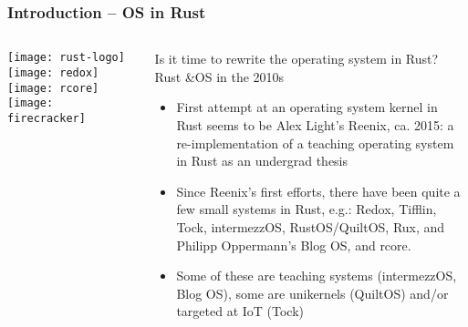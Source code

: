 \begin{frame}[plain]
	\frametitle{Introduction -- OS in Rust}
	
	
	
	\begin{columns}
		
		\begin{column}{.2\textwidth}
			
			\texttt{[image: rust-logo]}
			\texttt{[image: redox]}
			\texttt{[image: rcore]}
			\texttt{[image: firecracker]}
		\end{column}
		
		\begin{column}{.8\textwidth}
			
		Is it time to rewrite the operating
		system in Rust?
		 \\
		
	Rust \&OS in the 2010s

\begin{itemize}
	
	\item  First attempt at an operating system kernel in Rust seems to be
	Alex Light’s Reenix, ca. 2015: a re-implementation of a teaching
	operating system in Rust as an undergrad thesis
	
	
	\item  Since Reenix’s first efforts, there have been quite a few small
	systems in Rust, e.g.: Redox, Tifflin, Tock, intermezzOS,
	RustOS/QuiltOS, Rux, and Philipp Oppermann’s Blog OS, and rcore.
	
	\item Some of these are teaching systems (intermezzOS, Blog OS),
	some are unikernels (QuiltOS) and/or targeted at IoT (Tock)
	
	
\end{itemize}

		\end{column}
		
		
	\end{columns}
	
	
\end{frame}

